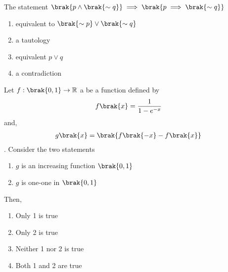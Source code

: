 \iffalse
    \title{2023}
    \author{EE24BTECH11001}
    \section{mcq-single}
\fi
    \item
        The statement $\brak{p \land \brak{\sim q}} \implies \brak{p \implies \brak{\sim q}}$
        \hfill{}
        \begin{multicols}{4}
            \begin{enumerate}
                \item equivalent to $\brak{\sim p} \lor \brak{\sim q}$
                    \columnbreak
                \item a tautology
                    \columnbreak
                \item equivalent $p \lor q$
                    \columnbreak
                \item a contradiction
            \end{enumerate}
        \end{multicols}

    \item Let $f : \brak{0, 1} \rightarrow \mathbb{R}$ a be a function defined by
        \begin{align}
            f\brak{x} = \frac{1}{1 - e^{-x}}
        \end{align} and, 
        \begin{align}
            g\brak{x} = \brak{f\brak{-x} - f\brak{x}}
        \end{align}. Consider the two statements
        \begin{enumerate}
            \item $g$ is an increasing function $\brak{0, 1}$
            \item $g$ is one-one in $\brak{0, 1}$
        \end{enumerate} Then,
        \hfill{}
        \begin{multicols}{4}
            \begin{enumerate}
                \item Only 1 is true \columnbreak
                \item Only 2 is true \columnbreak
                \item Neither 1 nor 2 is true \columnbreak
                \item Both 1 and 2 are true
            \end{enumerate}
        \end{multicols}


